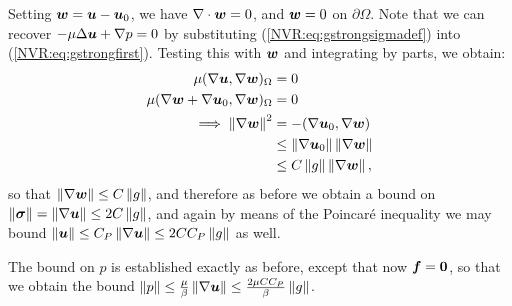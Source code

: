 Setting $\vect{w} = \vect{u} - \vect{u}_{0}$, we have $\NVRdiv \vect{w} = 0$, and $\vect{w} = 0$ on $\partial \Omega$.  Note that we can recover $-\mu \Delta \vect{u} + \NVRgrad p = 0$ by substituting (\ref{NVR:eq:gstrongsigmadef}) into (\ref{NVR:eq:gstrongfirst}).  Testing this with $\vect{w}$ and integrating by parts, we obtain:
\begin{align*}
\mu (\NVRgrad \vect{u},\NVRgrad \vect{w})_{\Omega} &= 0\\
\mu (\NVRgrad \vect{w} + \NVRgrad \vect{u}_{0},\NVRgrad \vect{w})_{\Omega} &= 0\\
\implies \norm{\NVRgrad \vect{w}}^{2} &= -(\NVRgrad \vect{u}_{0}, \NVRgrad \vect{w}) \\
&\leq \norm{ \NVRgrad \vect{u}_{0} } \norm{ \NVRgrad \vect{w} } \\
&\leq C \norm{g} \norm{ \NVRgrad \vect{w} },
\end{align*}
so that $\norm{ \NVRgrad \vect{w} } \leq  C \norm{ g }$, and therefore as before we obtain a bound on $\norm{\NVRtensor{\sigma}} = \norm{\NVRgrad \vect{u}} \leq 2 C \norm{g}$, and again by means of the Poincar\'{e} inequality we may bound $\norm{\vect{u}} \leq C_{P} \norm{\NVRgrad \vect{u}} \leq 2 C C_{P} \norm{ g }$ as well.

The bound on $p$ is established exactly as before, except that now $\vect{f} = \vect{0}$, so that we obtain the bound $\norm{p} \leq \frac{\mu}{\beta} \norm{\NVRgrad \vect{u}} \leq \frac{2 \mu C C_{P}}{\beta} \norm{ g }$.


